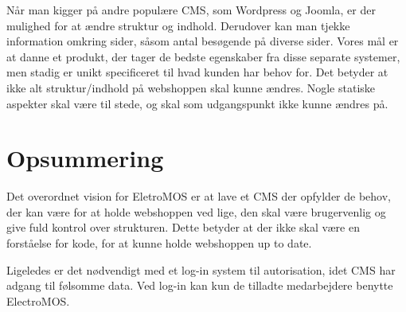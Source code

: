 Når man kigger på andre populære CMS, som Wordpress og Joomla, er der mulighed for at ændre struktur og indhold. Derudover kan man tjekke information omkring sider, såsom antal besøgende på diverse sider. Vores mål er at danne et produkt, der tager de bedste egenskaber fra disse separate systemer, men stadig er unikt specificeret til hvad kunden har behov for. Det betyder at ikke alt struktur/indhold på webshoppen skal kunne ændres. Nogle statiske aspekter skal være til stede, og skal som udgangspunkt ikke kunne ændres på.

\section{Opsummering}
Det overordnet vision for EletroMOS er at lave et CMS der opfylder de behov, der kan være for at holde webshoppen ved lige, den skal være brugervenlig og give fuld kontrol over strukturen. Dette betyder at der ikke skal være en forståelse for kode, for at kunne holde webshoppen up to date. 

Ligeledes er det nødvendigt med et log-in system til autorisation, idet CMS har adgang til følsomme data. Ved log-in kan kun de tilladte medarbejdere benytte ElectroMOS.